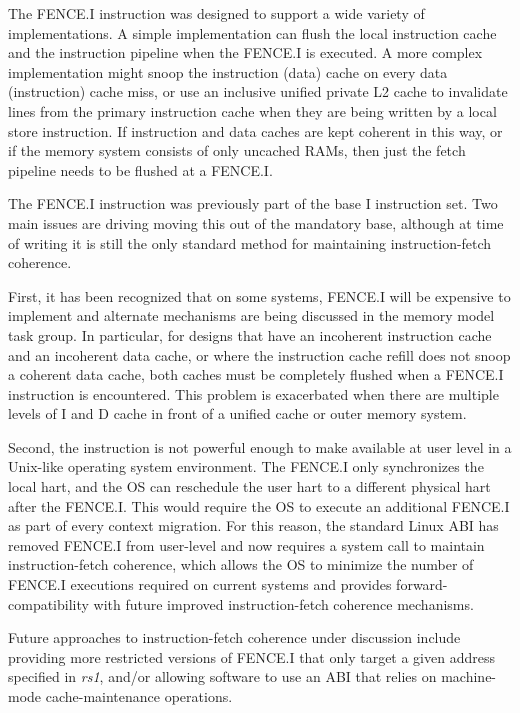 \begin{commentary}
The FENCE.I instruction was designed to support a wide variety of
implementations.  A simple implementation can flush the local
instruction cache and the instruction pipeline when the FENCE.I is
executed.  A more complex implementation might snoop the instruction
(data) cache on every data (instruction) cache miss, or use an
inclusive unified private L2 cache to invalidate lines from the
primary instruction cache when they are being written by a local store
instruction.  If instruction and data caches are kept coherent in this
way, or if the memory system consists of only uncached RAMs, then just
the fetch pipeline needs to be flushed at a FENCE.I.

The FENCE.I instruction was previously part of the base I instruction
set.  Two main issues are driving moving this out of the mandatory
base, although at time of writing it is still the only standard method
for maintaining instruction-fetch coherence.

First, it has been recognized that on some systems, FENCE.I will be
expensive to implement and alternate mechanisms are being discussed in
the memory model task group.  In particular, for designs that have an
incoherent instruction cache and an incoherent data cache, or where
the instruction cache refill does not snoop a coherent data cache,
both caches must be completely flushed when a FENCE.I instruction is
encountered.  This problem is exacerbated when there are multiple
levels of I and D cache in front of a unified cache or outer memory
system.

Second, the instruction is not powerful enough to make available at
user level in a Unix-like operating system environment.  The FENCE.I
only synchronizes the local hart, and the OS can reschedule the user
hart to a different physical hart after the FENCE.I.  This would
require the OS to execute an additional FENCE.I as part of every
context migration.  For this reason, the standard Linux ABI has
removed FENCE.I from user-level and now requires a system call to
maintain instruction-fetch coherence, which allows the OS to minimize
the number of FENCE.I executions required on current systems and
provides forward-compatibility with future improved instruction-fetch
coherence mechanisms.

Future approaches to instruction-fetch coherence under discussion
include providing more restricted versions of FENCE.I that only target
a given address specified in {\em rs1}, and/or allowing software to use an
ABI that relies on machine-mode cache-maintenance operations.
\end{commentary}

